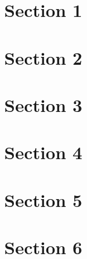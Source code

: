 \section{Section 1}
  \lipsum[2-4]

\section{Section 2}
  \lipsum[2-4]

\section{Section 3}
  \lipsum[2-4]

\section{Section 4}
  \lipsum[2-4]

\section{Section 5}
  \lipsum[2-4]

\section{Section 6}
  \lipsum[2-4]
